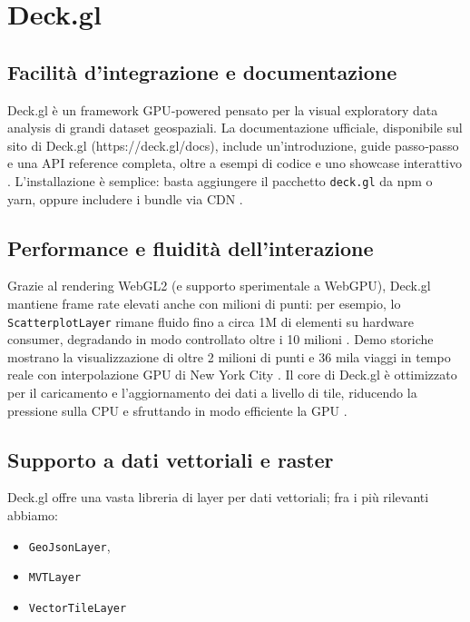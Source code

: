\section{Deck.gl}
\label{ch:deckgl}

\subsection{Facilità d'integrazione e documentazione}
Deck.gl è un framework GPU‑powered pensato per la visual exploratory data analysis
di grandi dataset geospaziali. La documentazione ufficiale, disponibile sul sito
di Deck.gl (https://deck.gl/docs), include un'introduzione, guide passo‑passo e una
API reference completa, oltre a esempi di codice e uno showcase interattivo
\cite{deckgl-docs}. L'installazione è semplice: basta aggiungere il pacchetto
\texttt{deck.gl} da npm o yarn, oppure includere i bundle via CDN
\cite{deckgl-npm,deckgl-github}.

\subsection{Performance e fluidità dell'interazione}
Grazie al rendering WebGL2 (e supporto sperimentale a WebGPU), Deck.gl mantiene frame
rate elevati anche con milioni di punti: per esempio, lo \texttt{ScatterplotLayer}
rimane fluido fino a circa 1M di elementi su hardware consumer, degradando in modo
controllato oltre i 10 milioni \cite{deckgl-performance}. Demo storiche mostrano
la visualizzazione di oltre 2 milioni di punti e 36 mila viaggi in tempo reale
con interpolazione GPU di New York City \cite{deckgl-uber-blog}. Il core di Deck.gl
è ottimizzato per il caricamento e l'aggiornamento dei dati a livello di tile,
riducendo la pressione sulla CPU e sfruttando in modo efficiente la GPU
\cite{deckgl-github}.

\subsection{Supporto a dati vettoriali e raster}
Deck.gl offre una vasta libreria di layer per dati vettoriali; fra i più rilevanti
abbiamo:

\begin{itemize}
  \item \texttt{GeoJsonLayer},

  \item \texttt{MVTLayer}

  \item \texttt{VectorTileLayer}
\end{itemize}


